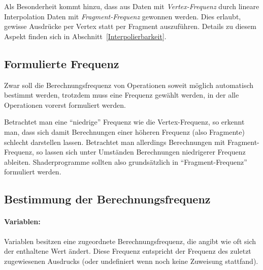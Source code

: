\documentclass[twoside,a4paper,fleqn,12pt]{book}
\begin{document}
Als Besonderheit kommt hinzu, dass aus Daten mit \emph{Vertex-Frequenz} durch lineare Interpolation Daten mit
\emph{Fragment-Frequenz} gewonnen werden. %
Dies erlaubt, gewisse Ausdrücke per Vertex statt per Fragment auszuführen. Details zu diesem Aspekt finden sich in
Abschnitt~\ref{Interpolierbarkeit}.

\subsection{Formulierte Frequenz}
\label{formulierte_frequenz}

Zwar soll die Berechnungsfrequenz von Operationen soweit möglich automatisch bestimmt werden, trotzdem muss eine Frequenz
gewählt werden, in der alle Operationen vorerst formuliert werden.

Betrachtet man eine "`niedrige"' Frequenz wie die Vertex-Frequenz, so erkennt man, dass sich damit Berechnungen einer höheren
Frequenz (also Fragmente) schlecht darstellen lassen. Betrachtet man allerdings Berechnungen mit Fragment-Frequenz, so lassen sich
unter Umständen Berechnungen niedrigerer Frequenz ableiten.
Shaderprogramme sollten also grundsätzlich in "`Fragment-Frequenz"' formuliert werden.

\subsection{Bestimmung der Berechnungsfrequenz}

\paragraph{Variablen:} Variablen besitzen eine zugeordnete Berechnungsfrequenz, die angibt wie oft sich der enthaltene Wert ändert.
Diese Frequenz entspricht der Frequenz des zuletzt zugewiesenen Ausdrucks (oder undefiniert wenn noch keine Zuweisung stattfand).
\end{document}

